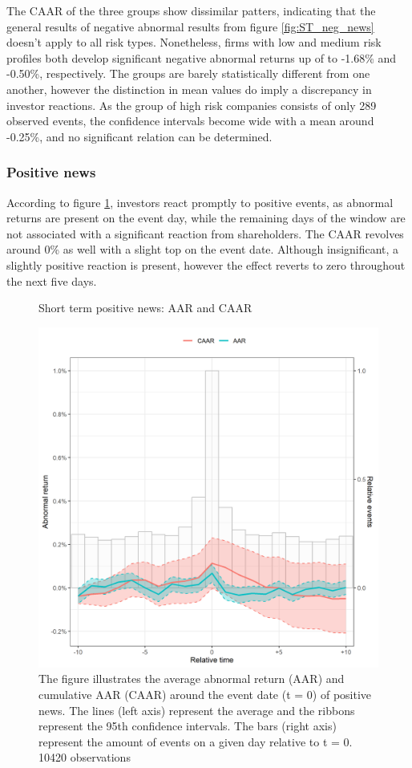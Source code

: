 The CAAR of the three groups show dissimilar patters, indicating that the general results of negative abnormal results from figure \ref{fig:ST_neg_news} doesn't apply to all risk types. Nonetheless, firms with low and medium risk profiles both develop significant negative abnormal returns up of to -1.68\% and -0.50\%, respectively. The groups are barely statistically different from one another, however the distinction in mean values do imply a discrepancy in investor reactions. As the group of high risk companies consists of only 289 observed events, the confidence intervals become wide with a mean around -0.25\%, and no significant relation can be determined. 



\subsubsection{Positive news}

According to figure \ref{fig:ST_pos_news}, investors react promptly to positive events, as abnormal returns are present on the event day, while the remaining days of the window are not associated with a significant reaction from shareholders. The CAAR revolves around 0\% as well with a slight top on the event date. Although insignificant, a slightly positive reaction is present, however the effect reverts to zero throughout the next five days.     

\begin{figure} [H] 
    \centering
    \caption{Short term positive news: AAR and CAAR}
    \includegraphics[scale=0.6]{Projekt/1.Figures analysis/ST_positive_all_CI.png}
    \caption*{\footnotesize The figure illustrates the average abnormal return (AAR) and cumulative AAR (CAAR) around the event date (t = 0) of positive news. The lines (left axis) represent the average and the ribbons represent the 95th confidence intervals. The bars (right axis) represent the amount of events on a given day relative to t = 0. 10420  observations}
    \label{fig:ST_pos_news}
\end{figure}

